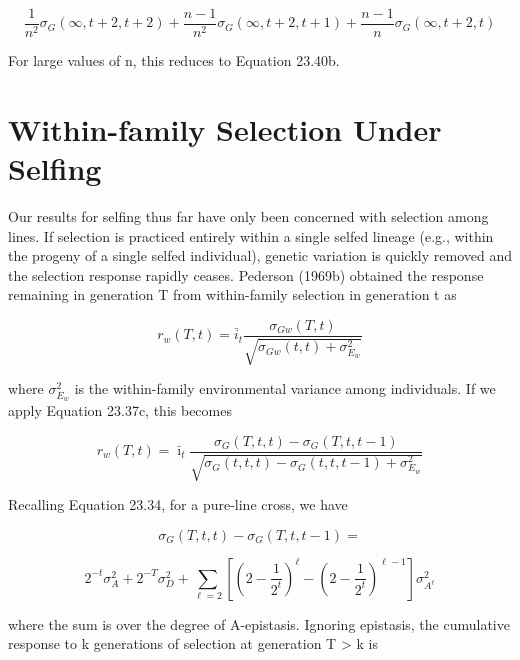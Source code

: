 \documentclass{article}
\begin{document}
\begin{equation}
\frac{1}{n^{2}}\sigma_{G}(\infty,t+2,t+2)+\frac{n-1}{n^{2}}\sigma_{G}(\infty,t+2,t+1)+\frac{n-1}{n}\sigma_{G}(\infty,t+2,t)
\tag{23.41b}
\label{eq:23_41b}
\end{equation}

For large values of n, this reduces to Equation 23.40b.

\section{Within-family Selection Under Selfing}
Our results for selfing thus far have only been concerned with selection among lines. If selection is practiced entirely within a single selfed lineage (e.g., within the progeny of a single selfed individual), genetic variation is quickly removed and the selection response rapidly ceases. Pederson (1969b) obtained the response remaining in generation T from within-family selection in generation t as

\begin{equation}
r_{w}(T,t)=\bar{i}_{t}\frac{\sigma_{Gw}(T,t)}{\sqrt{\sigma_{Gw}(t,t)+\sigma_{E_{w}}^{2}}}
\tag{23.42a}
\label{eq:23_42a}
\end{equation}

where  $ \sigma_{E_{w}}^{2} $ is the within-family environmental variance among individuals. If we apply Equation 23.37c, this becomes

\begin{equation}
r_{w}(T,t)=\bar{\imath}_{t}\frac{\sigma_{G}(T,t,t)-\sigma_{G}(T,t,t-1)}{\sqrt{\sigma_{G}(t,t,t)-\sigma_{G}(t,t,t-1)+\sigma_{E_{w}}^{2}}}
\tag{23.42b}
\label{eq:23_42b}
\end{equation}

Recalling Equation 23.34, for a pure-line cross, we have

\begin{equation}
\sigma_{G}(T,t,t)-\sigma_{G}(T,t,t-1)=
\end{equation}

\begin{equation}
2^{-t}\sigma_{A}^{2}+2^{-T}\sigma_{D}^{2}+\sum_{\ell=2}\left[\left(2-\frac{1}{2^{t}}\right)^{\ell}-\left(2-\frac{1}{2^{t}}\right)^{\ell-1}\right]\sigma_{A^{\ell}}^{2}
\tag{23.42c}
\label{eq:23_42c}
\end{equation}

where the sum is over the degree of A-epistasis. Ignoring epistasis, the cumulative response to k generations of selection at generation T > k is
\end{document}
